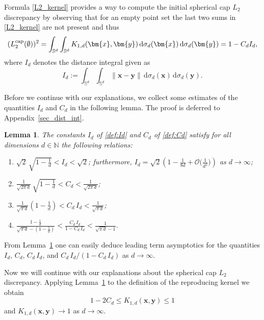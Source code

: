 \documentclass[12pt]{article}
\newcommand{\cp}{{\rm cap}}
\newtheorem{lemma}{Lemma}
\begin{document}
%
Formula \eqref{L2_kernel} provides a way to compute the initial spherical cap $L_2$ discrepancy by observing that for an empty point set the last two sums in \eqref{L2_kernel} are not present and thus
\begin{equation}\label{init:err:fo}
(L_2^{\cp}(\emptyset))^2 = \int_{\mathbb{S}^d} \int_{\mathbb{S}^d} K_{1,d}(\bm{x}, \bm{y}) \,\mathrm{d} \sigma_d(\bm{x}) \,\mathrm{d} \sigma_d(\bm{y}) = 1 - C_d I_d,
\end{equation}
where $I_d$ denotes the distance integral given as
\begin{equation}\label{def:Id}
I_d :=  \int_{\mathbb{S}^d} \int_{\mathbb{S}^d} \|\bm{x} - \bm{y}\| \,\mathrm{d} \sigma_d(\bm{x}) \,\mathrm{d} \sigma_d(\bm{y}).
\end{equation}

Before we continue with our explanations, we collect some estimates of the quantities $I_d$ and $C_d$ in the following lemma. The proof is deferred to Appendix~\ref{sec_dist_int}. 
\begin{lemma}
\label{lem:C.d.I.d.inequalities}
The constants $I_d$ of \eqref{def:Id} and $C_d$ of \eqref{def:Cd} satisfy for all dimensions $d \in \mathbb{N}$ the following relations:
\begin{enumerate}
\item $\displaystyle \sqrt{2} \, \sqrt{1 - \frac{1}{d}} < I_d < \sqrt{2}$; furthermore, $\displaystyle I_d = \sqrt{2} \left( 1 - \tfrac{1}{8d} + \mathcal{O}\big( \tfrac{1}{d^2} \big) \right)$ as $d \to \infty$;
\item $\displaystyle \frac{1}{\sqrt{2 \pi \, d}} \, \sqrt{1 - \frac{1}{d}} < C_d < \frac{1}{\sqrt{2 \pi \, d}}$;
\item $\displaystyle \frac{1}{\sqrt{\pi \, d}} \left( 1 - \frac{1}{d} \right) < C_d \, I_d < \frac{1}{\sqrt{\pi \, d}}$;
\item $\displaystyle  \frac{1 - \frac{1}{d}}{\sqrt{\pi \, d} - \left( 1 - \frac{1}{d} \right)} < \frac{C_d \, I_d}{1 - C_d \, I_d} < \frac{1}{\sqrt{\pi \, d} - 1}$.
\end{enumerate}
\end{lemma}

From Lemma~\ref{lem:C.d.I.d.inequalities} one can easily deduce leading term asymptotics for the quantities $I_d$, $C_d$, $C_d \, I_d$, and $C_d \, I_d / ( 1 - C_d \, I_d )$ as $d \to \infty$.

Now we will continue with our explanations about the spherical cap $L_2$ discrepancy. Applying Lemma~\ref{lem:C.d.I.d.inequalities} to the definition of the reproducing kernel we obtain 
\begin{equation}\label{kernel_bounds}
1 - 2 C_d \le K_{1,d}(\bm{x}, \bm{y}) \le 1 
\end{equation}
and $K_{1,d}(\bm{x}, \bm{y}) \to 1$ as $d \to \infty$.
\end{document}
